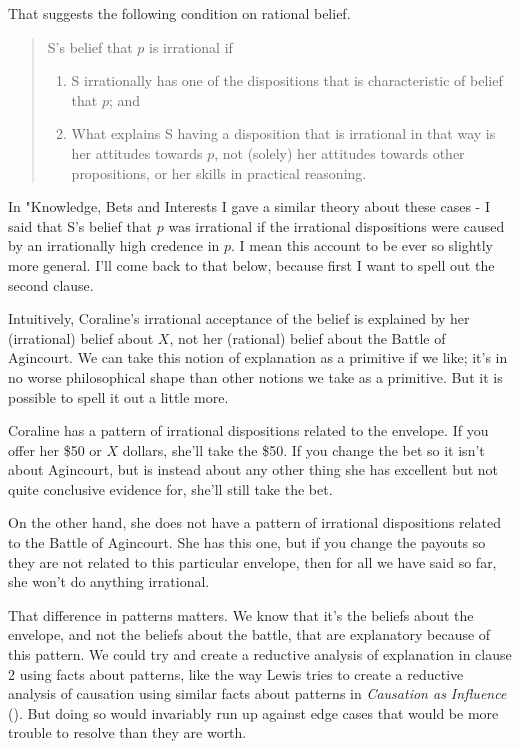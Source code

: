 \documentclass[11pt,]{book}
\providecommand{\tightlist}{%
  \setlength{\itemsep}{0pt}\setlength{\parskip}{0pt}}
\begin{document}
That suggests the following condition on rational belief.

\begin{quote}
S's belief that \(p\) is irrational if

\begin{enumerate}
\def\labelenumi{\arabic{enumi}.}
\tightlist
\item
  S irrationally has one of the dispositions that is characteristic of belief that \(p\); and
\item
  What explains S having a disposition that is irrational in that way is her attitudes towards \(p\), not (solely) her attitudes towards other propositions, or her skills in practical reasoning.
\end{enumerate}
\end{quote}

In "Knowledge, Bets and Interests I gave a similar theory about these cases - I said that S's belief that \(p\) was irrational if the irrational dispositions were caused by an irrationally high credence in \(p\). I mean this account to be ever so slightly more general. I'll come back to that below, because first I want to spell out the second clause.

Intuitively, Coraline's irrational acceptance of the belief is explained by her (irrational) belief about \(X\), not her (rational) belief about the Battle of Agincourt. We can take this notion of explanation as a primitive if we like; it's in no worse philosophical shape than other notions we take as a primitive. But it is possible to spell it out a little more.

Coraline has a pattern of irrational dispositions related to the envelope. If you offer her \$50 or \(X\) dollars, she'll take the \$50. If you change the bet so it isn't about Agincourt, but is instead about any other thing she has excellent but not quite conclusive evidence for, she'll still take the bet.

On the other hand, she does not have a pattern of irrational dispositions related to the Battle of Agincourt. She has this one, but if you change the payouts so they are not related to this particular envelope, then for all we have said so far, she won't do anything irrational.

That difference in patterns matters. We know that it's the beliefs about the envelope, and not the beliefs about the battle, that are explanatory because of this pattern. We could try and create a reductive analysis of explanation in clause 2 using facts about patterns, like the way Lewis tries to create a reductive analysis of causation using similar facts about patterns in \emph{Causation as Influence} (\citet{Lewis2004a}). But doing so would invariably run up against edge cases that would be more trouble to resolve than they are worth.
\end{document}
